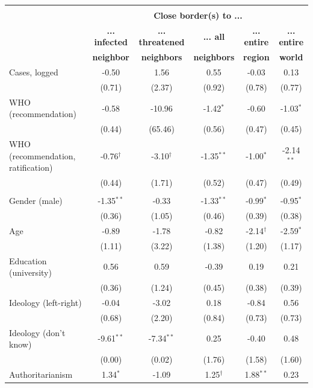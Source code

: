 \begin{table}[ht!]
\begin{center}
\footnotesize
\renewcommand{\arraystretch}{1.05}
\begin{tabular}{@{\extracolsep{4.8pt}}lccccc} 
\\[-1.8ex]\hline \\[-1.8ex]
 & \multicolumn{5}{c}{\normalsize{\textbf{Close border(s) to ...}}}
\\
  & \small{\textbf{... infected}} & \small{\textbf{... threatened}} & \small{\textbf{... all}} & \small{\textbf{... entire }} & \small{\textbf{... entire}}
 \\
  & \small{\textbf{neighbor}} & \small{\textbf{neighbors}} & \small{\textbf{neighbors}} & \small{\textbf{region}} & \small{\textbf{world}}
 \\
\hline
Cases, logged & -0.50 & 1.56 & 0.55 & -0.03 & 0.13\\
 & (0.71) & (2.37) & (0.92) & (0.78) & (0.77)\\
WHO (recommendation) & -0.58 & -10.96 & -1.42$^{*}$ & -0.60 & -1.03$^{*}$\\
 & (0.44) & (65.46) & (0.56) & (0.47) & (0.45)\\
WHO (recommendation, ratification) & -0.76$^{\dag}$ & -3.10$^{\dag}$ & -1.35$^{**}$ & -1.00$^{*}$ & -2.14$^{**}$\\
 & (0.44) & (1.71) & (0.52) & (0.47) & (0.49)\\
\\
Gender (male) & -1.35$^{**}$ & -0.33 & -1.33$^{**}$ & -0.99$^{*}$ & -0.95$^{*}$\\
 & (0.36) & (1.05) & (0.46) & (0.39) & (0.38)\\
Age & -0.89 & -1.78 & -0.82 & -2.14$^{\dag}$ & -2.59$^{*}$\\
 & (1.11) & (3.22) & (1.38) & (1.20) & (1.17)\\
Education (university) & 0.56 & 0.59 & -0.39 & 0.19 & 0.21\\
 & (0.36) & (1.24) & (0.45) & (0.38) & (0.39)\\
Ideology (left-right) & -0.04 & -3.02 & 0.18 & -0.84 & 0.56\\
 & (0.68) & (2.20) & (0.84) & (0.73) & (0.73)\\
Ideology (don't know) & -9.61$^{**}$ & -7.34$^{**}$ & 0.25 & -0.40 & 0.48\\
 & (0.00) & (0.02) & (1.76) & (1.58) & (1.60)\\
Authoritarianism & 1.34$^{*}$ & -1.09 & 1.25$^{\dag}$ & 1.88$^{**}$ & 0.23\\

\end{tabular}
\end{center}
\end{table}
